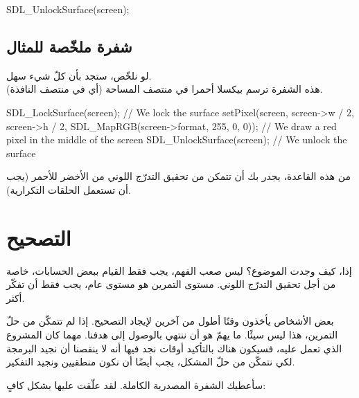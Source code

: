 \begin{Csource}
SDL_UnlockSurface(screen);
\end{Csource}

\subsection{شفرة  ملخّصة للمثال}

لو نلخّص، ستجد بأن كلّ شيء سهل.\\
هذه الشفرة ترسم بيكسلا أحمرا في منتصف المساحة
(أي في منتصف النافذة).

\begin{Csource}
SDL_LockSurface(screen); // We lock the surface
setPixel(screen, screen->w / 2, screen->h / 2, SDL_MapRGB(screen->format, 255, 0, 0)); // We draw a red pixel in the middle of the screen
SDL_UnlockSurface(screen); // We unlock the surface
\end{Csource}

من هذه القاعدة، يجدر بك أن تتمكن من تحقيق التدرّج اللوني من الأخضر للأحمر (يجب أن تستعمل الحلقات التكرارية).

\section{التصحيح}

إذا، كيف وجدت الموضوع؟ ليس صعب الفهم، يجب فقط القيام ببعض الحسابات، خاصة من أجل تحقيق التدرّج اللوني. مستوى التمرين هو مستوى عام، يجب فقط أن تفكّر أكثر.

بعض الأشخاص يأخذون وقتًا أطول من آخرين لإيجاد التصحيح. إذا لم تتمكّن من حلّ التمرين، هذا ليس سيئًا. ما يهمّ هو أن ننتهي بالوصول إلى هدفنا. مهما كان المشروع الذي تعمل عليه، فسيكون هناك بالتأكيد أوقات نجد فيها أنه لا ينقصنا أن نجيد البرمجة لكي نتمكّن من حلّ المشكل، يجب أيضًا أن نكون منطقيين ونجيد التفكير.

سأعطيك الشفرة المصدرية الكاملة. لقد علّقت عليها بشكل كافٍ:

